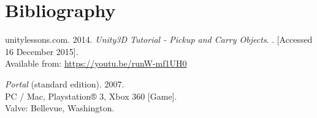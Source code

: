 \section{Bibliography}
\begin{thebibliography}{widestlabel}
	unitylessons.com. 2014. \textit{Unity3D Tutorial - Pickup and Carry Objects}.
	\newline
	[Online]. [Accessed 16 December 2015].\\
	Available from: \url{https://youtu.be/runW-mf1UH0}
	
	\textit{Portal} (standard edition). 2007.\\
	PC / Mac, Playstation® 3, Xbox 360 [Game].\\
	Valve: Bellevue, Washington.
\end{thebibliography}